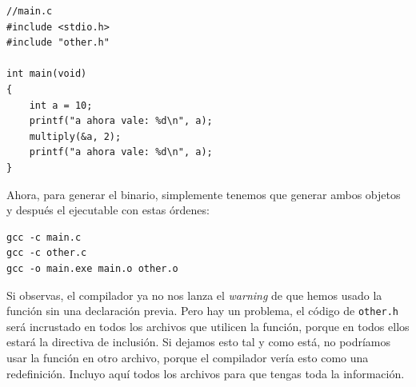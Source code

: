 \documentclass[a4paper]{article}
\begin{document}
\noindent
\begin{minipage}[H]{\linewidth}
\mbox{}
\begin{lstlisting}[style=C,
caption={Archivo principal con cabeceras incluidas},
label={lst:fileCofHeader}]
//main.c
#include <stdio.h>
#include "other.h"

int main(void)
{
    int a = 10;
    printf("a ahora vale: %d\n", a);
    multiply(&a, 2);
    printf("a ahora vale: %d\n", a);
}
\end{lstlisting}
\end{minipage}

Ahora, para generar el binario, simplemente tenemos que generar ambos
objetos y después el ejecutable con estas órdenes:

\noindent
\begin{minipage}[H]{\linewidth}
\mbox{}
\begin{lstlisting}[style=terminalStyle]
gcc -c main.c
gcc -c other.c
gcc -o main.exe main.o other.o
\end{lstlisting}
\end{minipage}

Si observas, el compilador ya no nos lanza el \emph{warning} de que hemos
usado la función sin una declaración previa. Pero hay un problema, el código
de \verb!other.h! será incrustado en todos los archivos que utilicen la función,
porque en todos ellos estará la directiva de inclusión. Si dejamos esto tal y
como está, no podríamos usar la función en otro archivo, porque el compilador
vería esto como una redefinición. Incluyo aquí todos los archivos para que
tengas toda la información.
\end{document}
